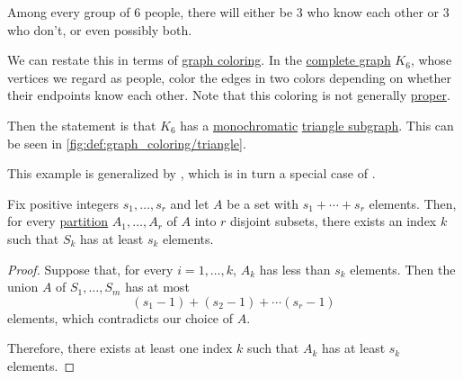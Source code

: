 \begin{example}\label{ex:ramsey_party_problem}
  Among every group of \( 6 \) people, there will either be \( 3 \) who know each other or \( 3 \) who don't, or even possibly both.

  We can restate this in terms of \hyperref[def:graph_coloring]{graph coloring}. In the \hyperref[def:complete_graph]{complete graph} \( K_6 \), whose vertices we regard as people, color the edges in two colors depending on whether their endpoints know each other. Note that this coloring is not generally \hyperref[def:graph_coloring/proper]{proper}.

  Then the statement is that \( K_6 \) has a \hyperref[def:set_coloring/monochromatic]{monochromatic} \hyperref[def:triangle_subgraph]{triangle subgraph}. This can be seen in \cref{fig:def:graph_coloring/triangle}.

  This example is generalized by , which is in turn a special case of .
\end{example}

\begin{lemma}\label{thm:ramsey_number_lemma}
  Fix positive integers \( s_1, \ldots, s_r \) and let \( A \) be a set with \( s_1 + \cdots + s_r \) elements. Then, for every \hyperref[def:set_partition]{partition} \( A_1, \ldots, A_r \) of \( A \) into \( r \) disjoint subsets, there exists an index \( k \) such that \( S_k \) has at least \( s_k \) elements.
\end{lemma}
\begin{proof}
  Suppose that, for every \( i = 1, \ldots, k \), \( A_k \) has less than \( s_k \) elements. Then the union \( A \) of \( S_1, \ldots, S_m \) has at most
  \begin{equation*}
    (s_1 - 1) + (s_2 - 1) + \cdots (s_r - 1)
  \end{equation*}
  elements, which contradicts our choice of \( A \).

  Therefore, there exists at least one index \( k \) such that \( A_k \) has at least \( s_k \) elements.
\end{proof}


